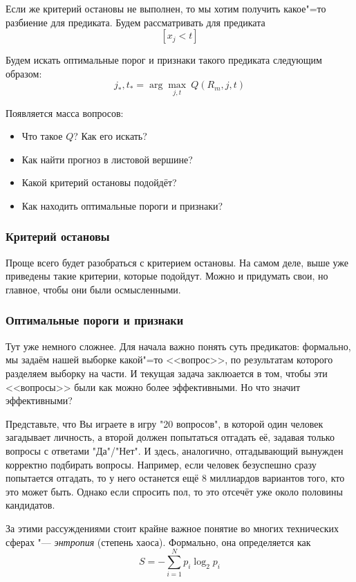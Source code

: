 Если же критерий остановы не выполнен, то мы хотим получить какое"=то разбиение для предиката. Будем рассматривать для предиката 
\[
[x_j < t]
\]

\newpage
Будем искать оптимальные порог и признаки такого предиката следующим образом:
\[
j_*, t_* = \arg\max_{j, t} ~ Q (R_m, j, t)
\]

Появляется масса вопросов:
\begin{itemize}
    \item Что такое $Q$? Как его искать?
    \item Как найти прогноз в листовой вершине?
    \item Какой критерий остановы подойдёт?
    \item Как находить оптимальные пороги и признаки?
\end{itemize}

\subsubsection*{Критерий остановы}

Проще всего будет разобраться с критерием остановы. На самом деле, выше уже приведены такие критерии, которые подойдут. Можно и придумать свои, но главное, чтобы они были осмысленными.

\subsubsection*{Оптимальные пороги и признаки}

Тут уже немного сложнее. Для начала важно понять суть предикатов: формально, мы задаём нашей выборке какой"=то <<вопрос>>, по результатам которого разделяем выборку на части. И текущая задача заклюается в том, чтобы эти <<вопросы>> были как можно более эффективными. Но что значит эффективными?

Представьте, что Вы играете в игру "20 вопросов", в которой один человек загадывает личность, а второй должен попытаться отгадать её, задавая только вопросы с ответами "Да"/"Нет". И здесь, аналогично, отгадывающий вынужден корректно подбирать вопросы. Например, если человек безуспешно сразу попытается отгадать, то у него останется ещё 8 миллиардов вариантов того, кто это может быть. Однако если спросить пол, то это отсечёт уже около половины кандидатов.

\newpage
За этими рассуждениями стоит крайне важное понятие во многих технических сферах "--- \textit{энтропия} (степень хаоса).
Формально, она определяется как
\[
S = - \sum_{i=1}^N p_i \log_2 p_i
\]

